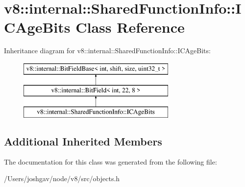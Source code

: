 \hypertarget{classv8_1_1internal_1_1_shared_function_info_1_1_i_c_age_bits}{}\section{v8\+:\+:internal\+:\+:Shared\+Function\+Info\+:\+:I\+C\+Age\+Bits Class Reference}
\label{classv8_1_1internal_1_1_shared_function_info_1_1_i_c_age_bits}
Inheritance diagram for v8\+:\+:internal\+:\+:Shared\+Function\+Info\+:\+:I\+C\+Age\+Bits\+:\begin{figure}[H]
\begin{center}
\leavevmode
\includegraphics[height=3.000000cm]{classv8_1_1internal_1_1_shared_function_info_1_1_i_c_age_bits}
\end{center}
\end{figure}
\subsection*{Additional Inherited Members}


The documentation for this class was generated from the following file\+:\begin{DoxyCompactItemize}
\item 
/\+Users/joshgav/node/v8/src/objects.\+h\end{DoxyCompactItemize}
